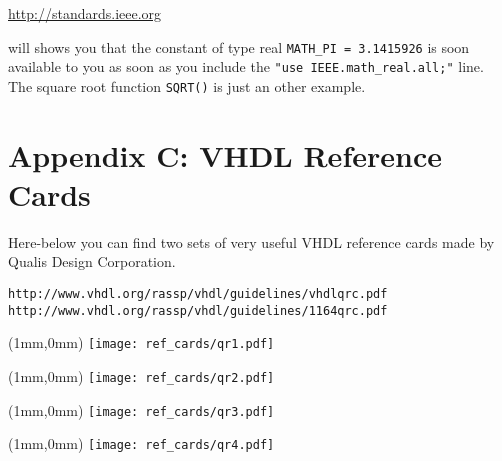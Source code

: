 \url{http://standards.ieee.org} 

will shows you that the constant of type real \texttt{MATH\_PI = 3.1415926} is soon available to you as soon as you include the \texttt{"use IEEE.math\_real.all;"} line. The square root function \texttt{SQRT()} is just an other example.

\chapter{Appendix C: VHDL Reference Cards}
Here-below you can find two sets of very useful VHDL reference cards made by Qualis Design Corporation.

\begin{verbatim}
http://www.vhdl.org/rassp/vhdl/guidelines/vhdlqrc.pdf
http://www.vhdl.org/rassp/vhdl/guidelines/1164qrc.pdf
\end{verbatim}

\newpage\clearpage
\thispagestyle{empty}
\begin{textblock*}{174mm}(1mm,0mm)
\texttt{[image: ref\_cards/qr1.pdf]}
\end{textblock*}
\null\newpage

\thispagestyle{empty}
\begin{textblock*}{174mm}(1mm,0mm)
\texttt{[image: ref\_cards/qr2.pdf]}
\end{textblock*}
\null\newpage

\thispagestyle{empty}
\begin{textblock*}{174mm}(1mm,0mm)
\texttt{[image: ref\_cards/qr3.pdf]}
\end{textblock*}
\null\newpage

\thispagestyle{empty}
\begin{textblock*}{174mm}(1mm,0mm)
\texttt{[image: ref\_cards/qr4.pdf]}
\end{textblock*}
\null\newpage


